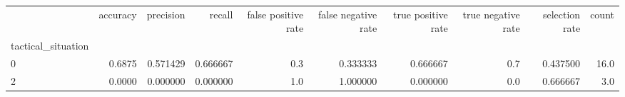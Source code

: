 \begin{tabular}{lrrrrrrrrr}
\toprule
{} &  accuracy &  precision &    recall &  false positive rate &  false negative rate &  true positive rate &  true negative rate &  selection rate &  count \\
tactical\_situation &           &            &           &                      &                      &                     &                     &                 &        \\
\midrule
0                  &    0.6875 &   0.571429 &  0.666667 &                  0.3 &             0.333333 &            0.666667 &                 0.7 &        0.437500 &   16.0 \\
2                  &    0.0000 &   0.000000 &  0.000000 &                  1.0 &             1.000000 &            0.000000 &                 0.0 &        0.666667 &    3.0 \\
\bottomrule
\end{tabular}

